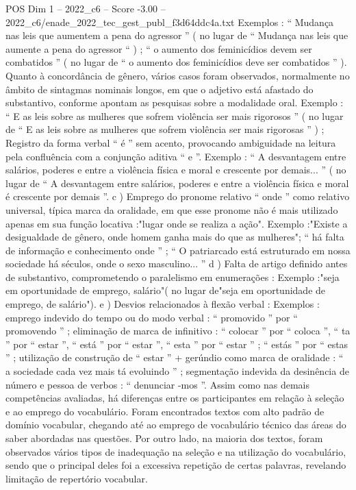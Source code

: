 \begin{textsample}{POS Dim 1 – 2022\_c6 – Score -3.00 – 2022\_c6/enade\_2022\_tec\_gest\_publ\_f3d64ddc4a.txt}
Exemplos : “ Mudança nas leis que aumentem a pena do agressor ” ( no lugar de “ Mudança nas leis que aumente a pena do agressor “ ) ; “ o aumento dos feminicídios devem ser combatidos ” ( no lugar de “ o aumento dos feminicídios deve ser combatidos ” ).
Quanto à concordância de gênero, vários casos foram observados, normalmente no âmbito de sintagmas nominais longos, em que o adjetivo está afastado do substantivo, conforme apontam as pesquisas sobre a modalidade oral.
Exemplo : “ E as leis sobre as mulheres que sofrem violência ser mais rigorosos ” ( no lugar de “ E as leis sobre as mulheres que sofrem violência ser mais rigorosas ” ) ; Registro da forma verbal “ é ” sem acento, provocando ambiguidade na leitura pela confluência com a conjunção aditiva “ e ”.
Exemplo : “ A desvantagem entre salários, poderes e entre a violência física e moral e crescente por demais... ” ( no lugar de “ A desvantagem entre salários, poderes e entre a violência física e moral é crescente por demais ”. c ) Emprego do pronome relativo “ onde ” como relativo universal, típica marca da oralidade, em que esse pronome não é mais utilizado apenas em sua função locativa :"lugar onde se realiza a ação".
Exemplo :"Existe a desigualdade de gênero, onde homem ganha mais do que as mulheres"; “ há falta de informação e conhecimento onde ” ; “ O patriarcado está estruturado em nossa sociedade há séculos, onde o sexo masculino... ” d ) Falta de artigo definido antes de substantivo, comprometendo o paralelismo em enumerações : Exemplo :"seja em oportunidade de emprego, salário"( no lugar de"seja em oportunidade de emprego, de salário"). e ) Desvios relacionados à flexão verbal : Exemplos : emprego indevido do tempo ou do modo verbal : “ promovido ” por “ promovendo ” ; eliminação de marca de infinitivo : “ colocar ” por “ coloca ”, “ ta ” por “ estar ”, “ está ” por “ estar ”, “ esta ” por “ estar ” ; “ estás ” por “ estas ” ; utilização de construção de “ estar ” + gerúndio como marca de oralidade : “ a sociedade cada vez mais tá evoluindo ” ; segmentação indevida da desinência de número e pessoa de verbos : “ denunciar -mos ”.
Assim como nas demais competências avaliadas, há diferenças entre os participantes em relação à seleção e ao emprego do vocabulário.
Foram encontrados textos com alto padrão de domínio vocabular, chegando até ao emprego de vocabulário técnico das áreas do saber abordadas nas questões.
Por outro lado, na maioria dos textos, foram observados vários tipos de inadequação na seleção e na utilização do vocabulário, sendo que o principal deles foi a excessiva repetição de certas palavras, revelando limitação de repertório vocabular.

\end{textsample}
